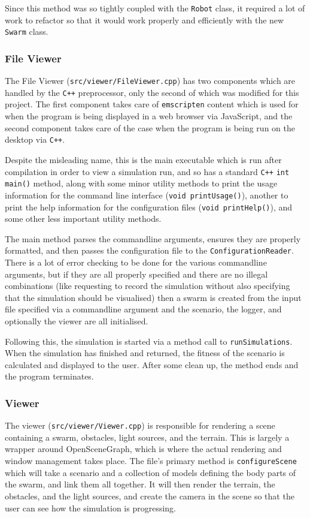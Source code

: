 \documentclass[11pt,a4paper]{article}
\begin{document}
Since this method was so tightly coupled with the \texttt{Robot} class, it
required a lot of work to refactor so that it would work properly and
efficiently with the new \texttt{Swarm} class.


\subsubsection{File Viewer}
The File Viewer (\texttt{src/viewer/FileViewer.cpp}) has two components which
are handled by the \texttt{C++} preprocessor, only the second of which was
modified for this project. The first component takes care of \texttt{emscripten}
content which is used for when the program is being displayed in a web browser
via JavaScript, and the second component takes care of the case when the
program is being run on the desktop via \texttt{C++}.

Despite the misleading name, this is the main executable which is run after
compilation in order to view a simulation run, and so has a standard
\texttt{C++} \texttt{int main()} method, along with some minor utility methods
to print the usage information for the command line interface (\texttt{void
printUsage()}), another to print the help information for the configuration
files (\texttt{void printHelp()}), and some other less important utility
methods.

The main method parses the commandline arguments, ensures they are properly
formatted, and then passes the configuration file to the
\texttt{ConfigurationReader}. There is a lot of error checking to be done for
the various commandline arguments, but if they are all properly specified and
there are no illegal combinations (like requesting to record the simulation
without also specifying that the simulation should be visualised) then a swarm
is created from the input file specified via a commandline argument and the
scenario, the logger, and optionally the viewer are all initialised.

Following this, the simulation is started via a method call to
\texttt{runSimulations}. When the simulation has finished and returned, the
fitness of the scenario is calculated and displayed to the user. After some
clean up, the method ends and the program terminates.

\subsubsection{Viewer}
The viewer (\texttt{src/viewer/Viewer.cpp}) is responsible for rendering a
scene containing a swarm, obstacles, light sources, and the terrain. This is
largely a wrapper around OpenSceneGraph, which is where the actual rendering
and window management takes place. The file's primary method is
\texttt{configureScene} which will take a scenario and a collection of models
defining the body parts of the swarm, and link them all together. It will then
render the terrain, the obstacles, and the light sources, and create the camera
in the scene so that the user can see how the simulation is progressing.
\end{document}
